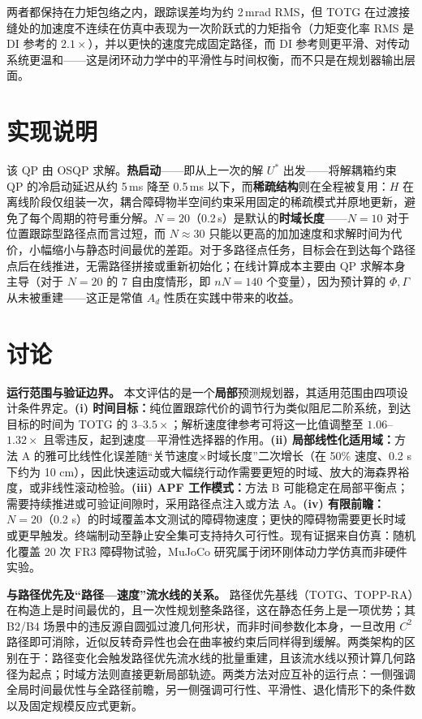 两者都保持在力矩包络之内，跟踪误差均为约 2\,mrad RMS，但 TOTG 在过渡接缝处的加速度不连续在仿真中表现为一次阶跃式的力矩指令（力矩变化率 RMS 是 DI 参考的 \(2.1\times\)），并以更快的速度完成固定路径，而 DI 参考则更平滑、对传动系统更温和——这是闭环动力学中的平滑性与时间权衡，而不只是在规划器输出层面。

\section{实现说明}\label{vii.-implementation-notes}

该 QP 由 OSQP \cite{osqp} 求解。\textbf{热启动}——即从上一次的解 \(U^*\) 出发——将解耦箱约束 QP 的冷启动延迟从约 5\,ms 降至 0.5\,ms 以下，而\textbf{稀疏结构}则在全程被复用：\(H\) 在离线阶段仅组装一次，耦合障碍物半空间约束采用固定的稀疏模式并原地更新，避免了每个周期的符号重分解。\(N=20\)（0.2\,s）是默认的\textbf{时域长度}——\(N=10\) 对于位置跟踪型路径点而言过短，而 \(N\approx30\) 只能以更高的加加速度和求解时间为代价，小幅缩小与静态时间最优的差距。对于多路径点任务，目标会在到达每个路径点后在线推进，无需路径拼接或重新初始化；在线计算成本主要由 QP 求解本身主导（对于 \(N{=}20\) 的 7 自由度情形，即 \(nN=140\) 个变量），因为预计算的 \(\Phi,\Gamma\) 从未被重建——这正是常值 \(A_d\) 性质在实践中带来的收益。

\section{讨论}\label{viii.-discussion}

\textbf{运行范围与验证边界。}\label{scope-and-limitations}
本文评估的是一个\textbf{局部}预测规划器，其适用范围由四项设计条件界定。\textbf{(i) 时间目标：}纯位置跟踪代价的调节行为类似阻尼二阶系统，到达目标的时间为 TOTG 的 \(3\)--\(3.5\times\)；解析速度律参考可将这一比值调整至 \(1.06\)--\(1.32\times\) 且零违反，起到速度—平滑性选择器的作用。\textbf{(ii) 局部线性化适用域：}方法 A 的雅可比线性化误差随“关节速度\(\times\)时域长度”二次增长（在 50\% 速度、0.2 s 下约为 10 cm），因此快速运动或大幅绕行动作需要更短的时域、放大的海森界裕度，或非线性滚动检验。\textbf{(iii) APF 工作模式：}方法 B 可能稳定在局部平衡点；需要持续推进或可验证间隙时，采用路径点注入或方法 A。\textbf{(iv) 有限前瞻：}\(N = 20\)（0.2 s）的时域覆盖本文测试的障碍物速度；更快的障碍物需要更长时域或更早触发。终端制动至静止安全集可支持持久可行性。现有证据来自仿真：随机化覆盖 20 次 FR3 障碍物试验，MuJoCo 研究属于闭环刚体动力学仿真而非硬件实验。

\textbf{与路径优先及“路径—速度”流水线的关系。}
路径优先基线（TOTG、TOPP-RA）在构造上是时间最优的，且一次性规划整条路径，这在静态任务上是一项优势；其 B2/B4 场景中的违反源自圆弧过渡几何形状，而非时间参数化本身，一旦改用 \(C^2\) 路径即可消除，近似反转奇异性也会在曲率被约束后同样得到缓解。两类架构的区别在于：路径变化会触发路径优先流水线的批量重建，且该流水线以预计算几何路径为起点；时域方法则直接更新局部轨迹。两类方法对应互补的运行点：一侧强调全局时间最优性与全路径前瞻，另一侧强调可行性、平滑性、退化情形下的条件数以及固定规模反应式更新。

